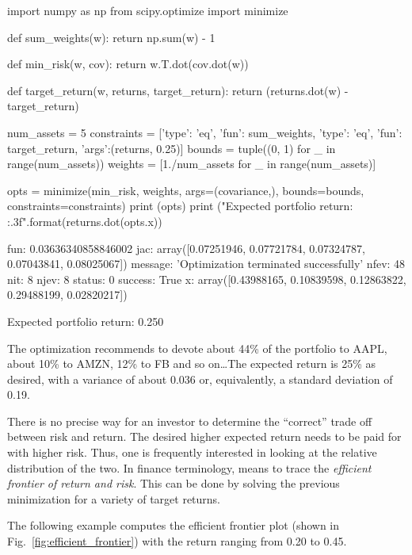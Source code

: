 \begin{ipython}
import numpy as np
from scipy.optimize import minimize

def sum_weights(w): 
    return np.sum(w) - 1

def min_risk(w, cov):
    return w.T.dot(cov.dot(w))

def target_return(w, returns, target_return): 
    return (returns.dot(w) - target_return)

num_assets = 5
constraints = [{'type': 'eq', 'fun': sum_weights},
               {'type': 'eq', 'fun': target_return, 'args':(returns, 0.25)}] 
bounds = tuple((0, 1) for _ in range(num_assets))
weights = [1./num_assets for _ in range(num_assets)]

opts = minimize(min_risk, weights, args=(covariance,),
                bounds=bounds, constraints=constraints)
print (opts)
print ("Expected portfolio return: {:.3f}".format(returns.dot(opts.x))
\end{ipython}
\begin{ioutput}
     fun: 0.03636340858846002
     jac: array([0.07251946, 0.07721784, 0.07324787, 0.07043841, 0.08025067])
 message: 'Optimization terminated successfully'
    nfev: 48
     nit: 8
    njev: 8
  status: 0
 success: True
       x: array([0.43988165, 0.10839598, 0.12863822, 0.29488199, 0.02820217])
       
Expected portfolio return: 0.250
\end{ioutput}

The optimization recommends to devote about 44\% of the portfolio to AAPL, about 10\% to AMZN, 12\% to FB and so on\ldots The expected return is 25\% as desired, with a variance of about 0.036 or, equivalently, a standard deviation of 0.19.


There is no precise way for an investor to determine the “correct” trade off between risk and return. The desired higher expected return needs to be paid for with higher risk. Thus, one is frequently interested in looking at the relative distribution of the two.
In finance terminology, means to trace the \emph{efficient frontier of return and risk}. This can be done by solving the previous minimization for a variety of target returns.

The following example computes the efficient frontier plot (shown in Fig.~\ref{fig:efficient_frontier}) with the return ranging from 0.20 to 0.45.


